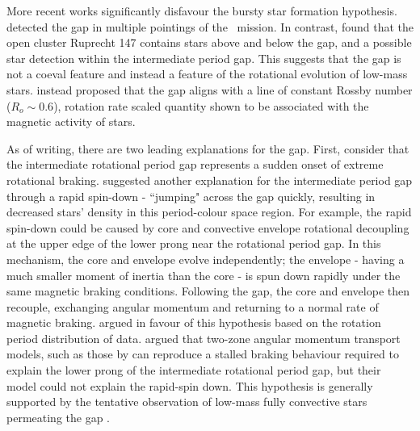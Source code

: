 More recent works significantly disfavour the bursty star formation hypothesis.
\citet{gordon_stellar_2021} detected the gap in multiple pointings of the \ktoo \ mission. 
In contrast, \citet{curtis_when_2020} found that the open cluster Ruprecht 147 contains stars above and below the gap, and a possible star detection within the intermediate period gap.
This suggests that the gap is not a coeval feature and instead a feature of the rotational evolution of low-mass stars.
\citet{curtis_when_2020} instead proposed that the gap aligns with a line of constant Rossby number ($R_o\sim 0.6$), rotation rate scaled quantity shown to be associated with the magnetic activity of stars.

As of writing, there are two leading explanations for the gap.
First, consider that the intermediate rotational period gap represents a sudden onset of extreme rotational braking.
\citet{mcquillan_rotation_2014} suggested another explanation for the intermediate period gap through a rapid spin-down - ``jumping" across the gap quickly, resulting in decreased stars' density in this period-colour space region.
For example, the rapid spin-down could be caused by core and convective envelope rotational decoupling at the upper edge of the lower prong near the rotational period gap.
In this mechanism, the core and envelope evolve independently; the envelope - having a much smaller moment of inertia than the core - is spun down rapidly under the same magnetic braking conditions.
Following the gap, the core and envelope then recouple, exchanging angular momentum and returning to a normal rate of magnetic braking. 
\citet{gordon_stellar_2021} argued in favour of this hypothesis based on the rotation period distribution of \ktoo{} data. 
\citet{curtis_when_2020} argued that two-zone angular momentum transport models, such as those by \citet{spada_competing_2020} can reproduce a stalled braking behaviour required to explain the lower prong of the intermediate rotational period gap, but their model could not explain the rapid-spin down.
This hypothesis is generally supported by the tentative observation of low-mass fully convective stars permeating the gap \citep{lu_bridging_2022}.

